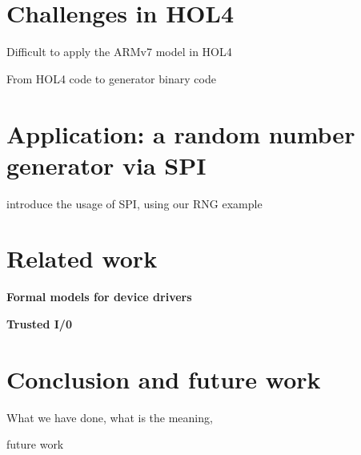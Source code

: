 \documentclass[runningheads]{llncs}
\begin{document}
\section{Challenges in HOL4}
Difficult to apply the ARMv7 model in HOL4

From HOL4 code to generator binary code

\section{Application: a random number generator via SPI}
introduce the usage of SPI, using our RNG example

\section{Related work}

\textbf{Formal models for device drivers}

\textbf{Trusted I/0}

\section{Conclusion and future work}
What we have done, what is the meaning,

future work
%
%
%
% 
% 
%



\end{document}
